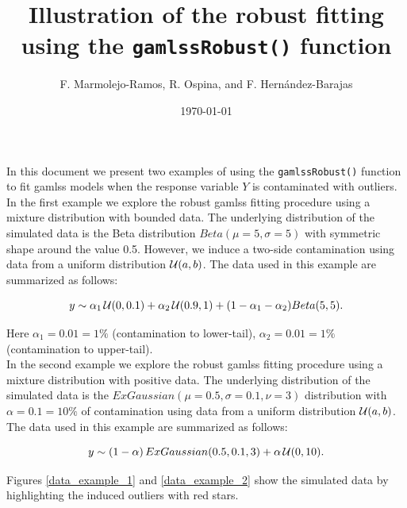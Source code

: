 \documentclass{article}
\title{Illustration of the robust fitting using the \texttt{gamlssRobust()} function} %
\author{F. Marmolejo-Ramos, R. Ospina, and F. Hern\'andez-Barajas} %
\date{\today} %
\begin{document}

\maketitle %


In this document we present two examples of using the \texttt{gamlssRobust()} function to fit gamlss models when the response variable $Y$ is contaminated with outliers.\\

In the first example we explore the robust gamlss fitting procedure using a mixture distribution with bounded data. The underlying distribution of the simulated data is the Beta distribution $Beta(\mu=5,\sigma=5)$ with symmetric shape around the value 0.5. However, we induce a two-side contamination using data from a uniform distribution ${\cal U}(a, b)$. The data used in this example are summarized as follows:

\begin{equation} \label{mod_ex_1}
   y \sim \alpha_1 \, {\cal U}(0, 0.1) + \alpha_2 \, {\cal U}(0.9, 1) + (1-\alpha_1-\alpha_2)Beta(5,5).
\end{equation}

Here $\alpha_1=0.01=1\%$ (contamination to lower-tail), $\alpha_2=0.01=1\%$ (contamination to upper-tail).\\

In the second example we explore the robust gamlss fitting procedure using a mixture distribution with positive data. The underlying distribution of the simulated data is the $ExGaussian(\mu=0.5, \sigma=0.1, \nu=3)$ distribution with $\alpha=0.1=10\%$ of contamination using data from a uniform distribution ${\cal U}(a, b)$. The data used in this example are summarized as follows:

\begin{equation} \label{mod_ex_2}
   y \sim (1-\alpha) \, ExGaussian(0.5, 0.1, 3) + \alpha \, {\cal U}(0, 10).
\end{equation}

Figures \ref{data_example_1} and \ref{data_example_2} show the simulated data by highlighting the induced outliers with red stars.
\end{document}
